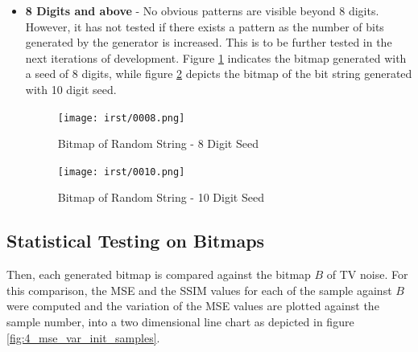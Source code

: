 \begin{itemize}
    \item \textbf{8 Digits and above} - No obvious patterns are visible beyond 8 digits. However, it has not tested if there exists a pattern as the number of bits generated by the generator is increased. This is to be further tested in the next iterations of development. Figure \ref{fig:4_seed_8} indicates the bitmap generated with a seed of 8 digits, while figure \ref{fig:4_seed_10} depicts the bitmap of the bit string generated with 10 digit seed.
    
    \begin{figure}[h!]
        \texttt{[image: irst/0008.png]}
        \centering
        \caption{Bitmap of Random String - 8 Digit Seed}
        \label{fig:4_seed_8}
    \end{figure}
    
    \begin{figure}[h!]
        \texttt{[image: irst/0010.png]}
        \centering
        \caption{Bitmap of Random String - 10 Digit Seed}
        \label{fig:4_seed_10}
    \end{figure}
\end{itemize}

\subsection{Statistical Testing on Bitmaps}

Then, each generated bitmap is compared against the bitmap $B$ of TV noise. For this comparison, the MSE and the SSIM values for each of the sample against $B$ were computed and the variation of the MSE values are plotted against the sample number, into a two dimensional line chart as depicted in figure \ref{fig:4_mse_var_init_samples}.

